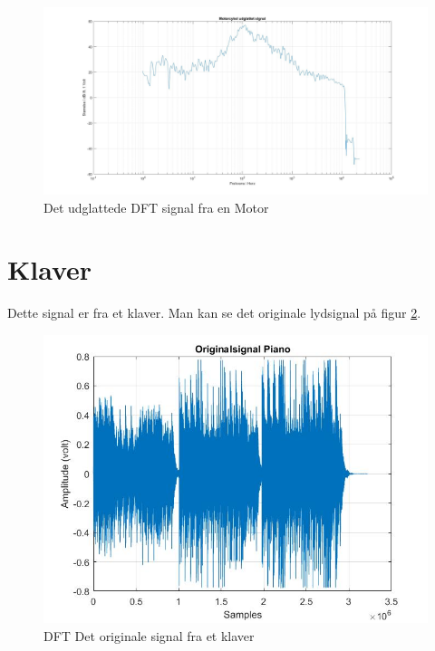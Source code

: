 \begin{figure}[H]
	\centering
	\includegraphics[width=140mm]{figures/Motor/udglattet.jpg}
	\caption{Det udglattede DFT signal fra en Motor}
	\label{fig:Motor udglattet}
\end{figure}

\section{Klaver}
Dette signal er fra et klaver. Man kan se det originale lydsignal på figur \ref{fig:Klaver original}.
\begin{figure}[H]
	\centering
	\includegraphics[width=140mm]{figures/Piano/original.jpg}
	\caption{DFT Det originale signal fra et klaver}
	\label{fig:Klaver original}
\end{figure}

